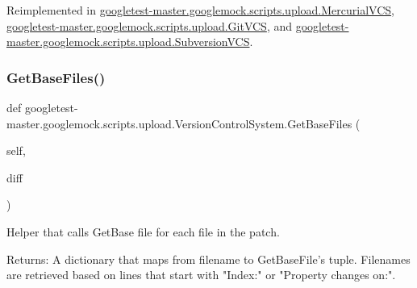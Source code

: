 Reimplemented in \mbox{\hyperlink{classgoogletest-master_1_1googlemock_1_1scripts_1_1upload_1_1_mercurial_v_c_s_a27454e4128398764560054bee78b5ded}{googletest-\/master.\+googlemock.\+scripts.\+upload.\+Mercurial\+V\+CS}}, \mbox{\hyperlink{classgoogletest-master_1_1googlemock_1_1scripts_1_1upload_1_1_git_v_c_s_adfdd00d7335071ff4c5096281c3b1c4f}{googletest-\/master.\+googlemock.\+scripts.\+upload.\+Git\+V\+CS}}, and \mbox{\hyperlink{classgoogletest-master_1_1googlemock_1_1scripts_1_1upload_1_1_subversion_v_c_s_a9e920210f36bc2a1f48d8e11aa4ba579}{googletest-\/master.\+googlemock.\+scripts.\+upload.\+Subversion\+V\+CS}}.

\mbox{\label{classgoogletest-master_1_1googlemock_1_1scripts_1_1upload_1_1_version_control_system_a620ddd01962d904ba25d7600d4a0c1e0}} 
\subsubsection{\texorpdfstring{GetBaseFiles()}{GetBaseFiles()}}
{\footnotesize\ttfamily def googletest-\/master.\+googlemock.\+scripts.\+upload.\+Version\+Control\+System.\+Get\+Base\+Files (\begin{DoxyParamCaption}\item[{}]{self,  }\item[{}]{diff }\end{DoxyParamCaption})}

\begin{DoxyVerb}Helper that calls GetBase file for each file in the patch.

Returns:
  A dictionary that maps from filename to GetBaseFile's tuple.  Filenames
  are retrieved based on lines that start with "Index:" or
  "Property changes on:".
\end{DoxyVerb}
 \mbox{\label{classgoogletest-master_1_1googlemock_1_1scripts_1_1upload_1_1_version_control_system_a22b33170a18fda5f1479c0be6f279dc6}} 
